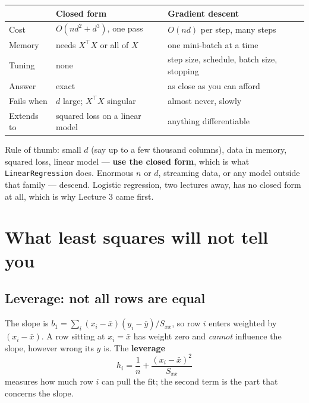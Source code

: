 \documentclass[11pt]{article}
\begin{document}
\begin{center}\small
\begin{tabular}{@{}lll@{}}
  \toprule
  & \textbf{Closed form} & \textbf{Gradient descent}\\
  \midrule
  Cost & $O(nd^2 + d^3)$, one pass & $O(nd)$ per step, many steps\\
  Memory & needs $X^{\!\top}\!X$ or all of $X$ & one mini-batch at a time\\
  Tuning & none & step size, schedule, batch size, stopping\\
  Answer & exact & as close as you can afford\\
  Fails when & $d$ large; $X^{\!\top}\!X$ singular & almost never, slowly\\
  Extends to & squared loss on a linear model & anything differentiable\\
  \bottomrule
\end{tabular}
\end{center}

Rule of thumb: small $d$ (say up to a few thousand columns), data in memory,
squared loss, linear model --- \textbf{use the closed form}, which is what
\texttt{LinearRegression} does. Enormous $n$ or $d$, streaming data, or any
model outside that family --- descend. Logistic regression, two lectures
away, has no closed form at all, which is why Lecture 3 came first.

\section{What least squares will not tell you}
\label{sec:limits}

\subsection{Leverage: not all rows are equal}
\label{sec:leverage}

The slope is $b_1 = \sum_i(x_i-\bar x)(y_i-\bar y)/S_{xx}$, so row $i$ enters
weighted by $(x_i - \bar x)$. A row sitting at $x_i = \bar x$ has weight zero
and \emph{cannot} influence the slope, however wrong its $y$ is. The
\textbf{leverage}
\begin{equation}
  h_i = \frac1n + \frac{(x_i - \bar x)^2}{S_{xx}}
  \label{eq:lev}
\end{equation}
measures how much row $i$ can pull the fit; the second term is the part that
concerns the slope.
\end{document}
